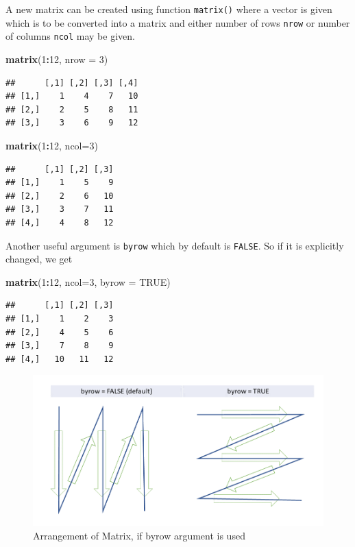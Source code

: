 \documentclass[
]{book}
\newenvironment{Shaded}{\begin{snugshade}}{\end{snugshade}}
\newcommand{\AttributeTok}[1]{\textcolor[rgb]{0.13,0.29,0.53}{#1}}
\newcommand{\ConstantTok}[1]{\textcolor[rgb]{0.56,0.35,0.01}{#1}}
\newcommand{\DecValTok}[1]{\textcolor[rgb]{0.00,0.00,0.81}{#1}}
\newcommand{\FunctionTok}[1]{\textcolor[rgb]{0.13,0.29,0.53}{\textbf{#1}}}
\newcommand{\NormalTok}[1]{#1}
\newcommand{\SpecialCharTok}[1]{\textcolor[rgb]{0.81,0.36,0.00}{\textbf{#1}}}
\begin{document}
A new matrix can be created using function \texttt{matrix()} where a vector is given which is to be converted into a matrix and either number of rows \texttt{nrow} or number of columns \texttt{ncol} may be given.

\begin{Shaded}
\begin{Highlighting}[]
\FunctionTok{matrix}\NormalTok{(}\DecValTok{1}\SpecialCharTok{:}\DecValTok{12}\NormalTok{, }\AttributeTok{nrow =} \DecValTok{3}\NormalTok{)}
\end{Highlighting}
\end{Shaded}

\begin{verbatim}
##      [,1] [,2] [,3] [,4]
## [1,]    1    4    7   10
## [2,]    2    5    8   11
## [3,]    3    6    9   12
\end{verbatim}

\begin{Shaded}
\begin{Highlighting}[]
\FunctionTok{matrix}\NormalTok{(}\DecValTok{1}\SpecialCharTok{:}\DecValTok{12}\NormalTok{, }\AttributeTok{ncol=}\DecValTok{3}\NormalTok{)}
\end{Highlighting}
\end{Shaded}

\begin{verbatim}
##      [,1] [,2] [,3]
## [1,]    1    5    9
## [2,]    2    6   10
## [3,]    3    7   11
## [4,]    4    8   12
\end{verbatim}

Another useful argument is \texttt{byrow} which by default is \texttt{FALSE}. So if it is explicitly changed, we get

\begin{Shaded}
\begin{Highlighting}[]
\FunctionTok{matrix}\NormalTok{(}\DecValTok{1}\SpecialCharTok{:}\DecValTok{12}\NormalTok{, }\AttributeTok{ncol=}\DecValTok{3}\NormalTok{, }\AttributeTok{byrow =} \ConstantTok{TRUE}\NormalTok{)}
\end{Highlighting}
\end{Shaded}

\begin{verbatim}
##      [,1] [,2] [,3]
## [1,]    1    2    3
## [2,]    4    5    6
## [3,]    7    8    9
## [4,]   10   11   12
\end{verbatim}

\begin{figure}

{\centering \includegraphics[width=0.6\linewidth]{images/byrow} 

}

\caption{Arrangement of Matrix, if byrow argument is used}\label{fig:byrow}
\end{figure}
\end{document}
